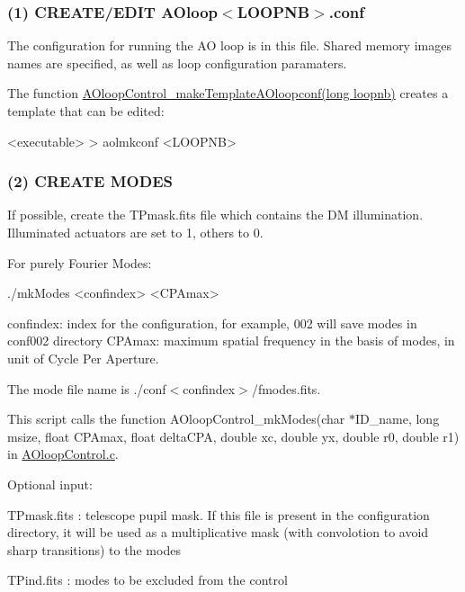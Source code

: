 \subsubsection*{(1) C\+R\+E\+A\+T\+E/\+E\+D\+I\+T A\+Oloop$<$\+L\+O\+O\+P\+N\+B$>$.\+conf}

The configuration for running the A\+O loop is in this file. Shared memory images names are specified, as well as loop configuration paramaters.

The function \hyperlink{AOloopControl_8h_a5c3b0bdcff0ed83ed3f9f217b14c014d}{A\+Oloop\+Control\+\_\+make\+Template\+A\+Oloopconf(long loopnb)} creates a template that can be edited\+: \begin{DoxyVerb}<executable>
> aolmkconf <LOOPNB>
\end{DoxyVerb}


\subsubsection*{(2) C\+R\+E\+A\+T\+E M\+O\+D\+E\+S}

If possible, create the T\+Pmask.\+fits file which contains the D\+M illumination. Illuminated actuators are set to 1, others to 0.

For purely Fourier Modes\+: \begin{DoxyVerb}./mkModes <confindex> <CPAmax>
\end{DoxyVerb}


confindex\+: index for the configuration, for example, 002 will save modes in conf002 directory C\+P\+Amax\+: maximum spatial frequency in the basis of modes, in unit of Cycle Per Aperture.

The mode file name is ./conf$<$confindex$>$/fmodes.fits.

This script calls the function A\+Oloop\+Control\+\_\+mk\+Modes(char $\ast$\+I\+D\+\_\+name, long msize, float C\+P\+Amax, float delta\+C\+P\+A, double xc, double yx, double r0, double r1) in \hyperlink{AOloopControl_8c}{A\+Oloop\+Control.\+c}.

Optional input\+:
\begin{DoxyItemize}
\item T\+Pmask.\+fits \+: telescope pupil mask. If this file is present in the configuration directory, it will be used as a multiplicative mask (with convolotion to avoid sharp transitions) to the modes
\item T\+Pind.\+fits \+: modes to be excluded from the control
\end{DoxyItemize}

